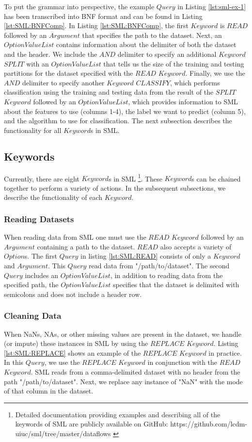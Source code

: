 To put the grammar into perspective, the example \(Query\) in Listing \ref{lst:sml-ex-1} has been transcribed into BNF format and can be found in Listing \ref{lst:SML:BNFComp}. In  Listing \ref{lst:SML:BNFComp},  the first \(Keyword\) is \(READ\) followed by an \(Argument\) that specifies the path to the dataset. Next, an \(OptionValueList\) contains information about the delimiter of both the dataset and the header. We include the \(AND\) delimiter to specify an additional \(Keyword\) \(SPLIT\) with an \(OptionValueList\) that tells us the size of the training and testing partitions for the dataset specified with the \(READ\) \(Keyword\). Finally,  we use the \(AND\) delimiter to specify another \(Keyword\) \(CLASSIFY\), which performs classification using the training and testing data from the result of the  \(SPLIT\) \(Keyword\) followed by an \(OptionValueList\), which provides information to SML about the features to use (columns 1-4), the label we want to predict (column 5), and the algorithm to use for classification. The next subsection describes the functionality for all \(Keyword\)s in SML.

\subsection{Keywords}
Currently, there are eight \(Keyword\)s in SML \footnote{Detailed documentation providing examples and describing all of the keywords of SML are publicly available on GitHub: https://github.com/lcdm-uiuc/sml/tree/master/dataflows \label{SML:Dataflow}}. These \(Keyword\)s can be chained together to perform a variety of actions. In the subsequent subsections, we describe the functionality of each \(Keyword\).

\subsubsection{Reading Datasets}
When reading data from SML one must use the \(READ\) \(Keyword\) followed by an \(Argument\) containing a path to the dataset. \(READ\) also accepts a variety of \(Option\)s. The first \(Query\) in listing \ref{lst:SML:READ} consists of only a \(Keyword\) and \(Argument\). This \(Query\) read data from "/path/to/dataset". The second \(Query\) includes an \(OptionValueList\), in addition to reading data from the specified path, the \(OptionValueList\) specifies that the dataset is delimited with semicolons and does not include a header row. 

\subsubsection{Cleaning Data}
When NaNs, NAs, or other missing values are present in the dataset, we handle (or impute) these instances in SML by using the \(REPLACE\) \(Keyword\).  Listing \ref{lst:SML:REPLACE}  shows an example of the \(REPLACE\) \(Keyword\) in practice. In this \(Query\), we use the \(REPLACE\) \(Keyword\) in conjunction with the \(READ\) \(Keyword\).  SML reads from a comma-delimited dataset with no header from the path "/path/to/dataset". Next, we replace any instance of "NaN" with the mode of that column in the dataset.

